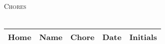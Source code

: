 \documentclass[12pt]{article}
\begin{document}
\begin{center}
  \large
  \textsc{Chores}\\
  \\[0.5cm]
  \LARGE

  \begin{tabularx}{\textwidth}{|c|c|X|c|c|}
    \hline
    \textbf{Home} & \textbf{Name} & \centering\textbf{Chore} & \textbf{Date} & \textbf{Initials} \\ \hline
    \hline
    
  \end{tabularx}
\end{center}
\end{document}

